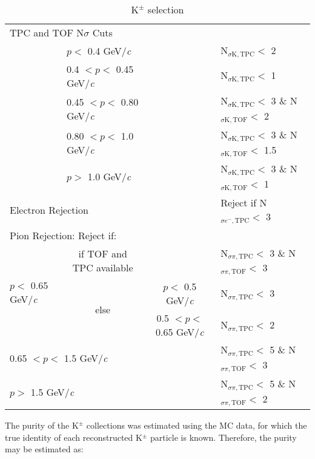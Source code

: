 \documentclass[ALICE,manyauthors]{cernphprep}
\newcommand{\Kpm}{$\mathrm{K^{\pm}}$\xspace}
\begin{document}
\begin{table}[htbp]
\begin{tabular}{lc|c|l}
   \multicolumn{4}{l}{TPC and TOF N$\sigma$ Cuts} \\
   \cline{2-4}
    & \multicolumn{1}{l}{$p <$ 0.4 GeV/\textit{c}} &  & N$_{\sigma \mathrm{K,TPC}} <$ 2 \\
   \cline{2-4}
    & \multicolumn{1}{l}{0.4 $< p <$ 0.45 GeV/\textit{c}} & & N$_{\sigma \mathrm{K,TPC}} <$ 1 \\
   \cline{2-4}     
    & \multicolumn{1}{l}{0.45 $< p <$ 0.80 GeV/\textit{c}} & & N$_{\sigma \mathrm{K,TPC}} <$ 3 \& N$_{\sigma \mathrm{K,TOF}} <$ 2 \\ 
   \cline{2-4}
    & \multicolumn{1}{l}{0.80 $< p <$ 1.0 GeV/\textit{c}} & & N$_{\sigma \mathrm{K,TPC}} <$ 3 \& N$_{\sigma \mathrm{K,TOF}} <$ 1.5 \\ 
   \cline{2-4}
    & \multicolumn{1}{l}{$p >$ 1.0 GeV/\textit{c}} & & N$_{\sigma \mathrm{K,TPC}} <$ 3 \& N$_{\sigma \mathrm{K,TOF}} <$ 1 \\ 
   \hline
   \multicolumn{3}{l|}{Electron Rejection} & Reject if N$_{\sigma e^{-},\mathrm{TPC}} < $ 3 \\
   \hline
   
   \multicolumn{4}{l}{Pion Rejection:  Reject if:} \\
   \hline
   \multirow{3}{*}{$p <$ 0.65 GeV/\textit{c}} & if TOF and TPC available & \multicolumn{1}{c}{} & N$_{\sigma \pi,\mathrm{TPC}} <$ 3 \& N$_{\sigma \pi,\mathrm{TOF}} <$ 3 \\
   \cline{2-4}
    & \multirow{2}{*}{else} & $p <$ 0.5 GeV/\textit{c} & N$_{\sigma \pi,\mathrm{TPC}} <$ 3 \\
   \cline{3-4}
    &  & 0.5 $< p <$ 0.65 GeV/\textit{c} & N$_{\sigma \pi,\mathrm{TPC}} <$ 2 \\
   \cline{2-4}
   \multicolumn{3}{l|}{0.65 $< p <$ 1.5 GeV/\textit{c}} & N$_{\sigma \pi,\mathrm{TPC}} <$ 5 \& N$_{\sigma \pi,\mathrm{TOF}} <$ 3 \\
   \cline{2-4}
   \multicolumn{3}{l|}{$p >$ 1.5 GeV/\textit{c}} & N$_{\sigma \pi,\mathrm{TPC}} <$ 5 \& N$_{\sigma \pi,\mathrm{TOF}} <$ 2 \\
   \hline
  \end{tabular}
 \caption{\Kpm selection}
 \label{tab:KchCuts} 
\end{table}

The purity of the \Kpm collections was estimated using the MC data, for which the true identity of each reconstructed K$^{\pm}$ particle is known.  Therefore, the purity may be estimated as:
\end{document}
